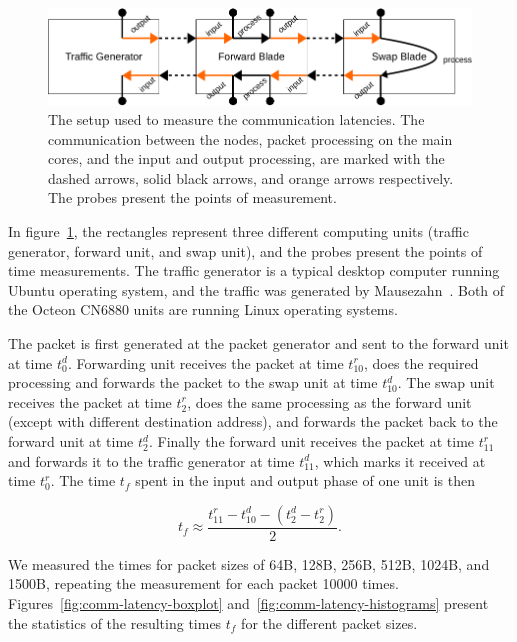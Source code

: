 \begin{figure}[]
  \begin{center}
    \includegraphics[width=\textwidth]{images/comm-measurement-setup.pdf}
    \caption{The setup used to measure the communication latencies. The communication between the nodes, packet processing on the main cores, and the input and output processing, are marked with the dashed arrows, solid black arrows, and orange arrows respectively. The probes present the points of measurement.}
    \label{fig:comm-setup}
  \end{center}
\end{figure}

In figure~\ref{fig:comm-setup}, the rectangles represent three different computing units (traffic generator, forward unit, and swap unit), and the probes present the points of time measurements. The traffic generator is a typical desktop computer running Ubuntu operating system, and the traffic was generated by Mausezahn~\cite{mausezahn}. Both of the Octeon CN6880 units are running Linux operating systems.

The packet is first generated at the packet generator and sent to the forward unit at time $t^{d}_{0}$. Forwarding unit receives the packet at time $t^{r}_{10}$, does the required processing and forwards the packet to the swap unit at time $t^{d}_{10}$. The swap unit receives the packet at time $t^{r}_{2}$, does the same processing as the forward unit (except with different destination address), and forwards the packet back to the forward unit at time $t^{d}_{2}$. Finally the forward unit receives the packet at time $t^{r}_{11}$ and forwards it to the traffic generator at time $t^{d}_{11}$, which marks it received at time $t^{r}_{0}$. The time $t_{f}$ spent in the input and output phase of one unit is then

\begin{equation}
  \label{eq:1}
  t_{f} \approx \frac{t^{r}_{11} - t^{d}_{10} - (t^{d}_{2} - t^{r}_{2})}{2}.
\end{equation}

We measured the times for packet sizes of 64B, 128B, 256B, 512B, 1024B, and 1500B, repeating the measurement for each packet 10000 times. Figures~\ref{fig:comm-latency-boxplot} and~\ref{fig:comm-latency-histograms} present the statistics of the resulting times $t_{f}$ for the different packet sizes.

